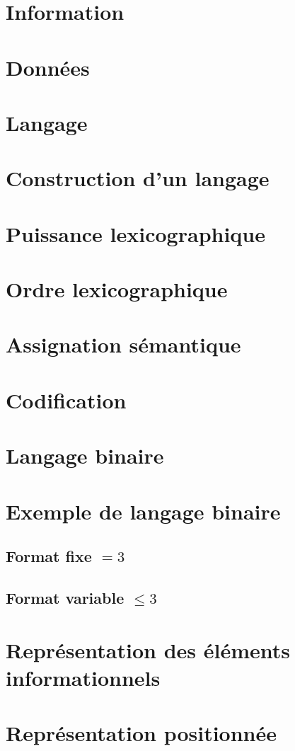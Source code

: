 	\section{Information}
	\section{Données}
	\section{Langage}
	\section{Construction d'un langage}
	\section{Puissance lexicographique}
	\section{Ordre lexicographique}
	\section{Assignation sémantique}
	\section{Codification}
	\section{Langage binaire}
	\section{Exemple de langage binaire}
		\subsection{Format fixe $=3$}
		\subsection{Format variable $\le 3$}
	\section{Représentation des éléments informationnels}
	\section{Représentation positionnée}
